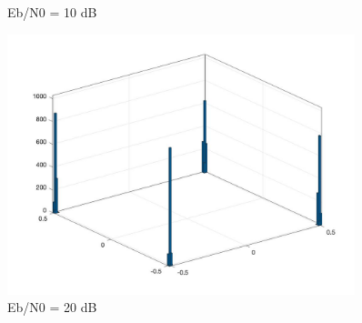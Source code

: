 \documentclass{article}
\begin{document}
\begin{CJK*}{UTF8}{bsmi}
\begin{figure}[!htb]
    \caption{\label{fig:2a_10.jpg} Eb/N0 = 10 dB}
    \end{figure}
    \begin{figure}[!htb]
    \centering
    \includegraphics[width=0.9\textwidth]{2a_20.jpg}
    \caption{\label{fig:2a_20.jpg} Eb/N0 = 20 dB}
    \end{figure}

\pagebreak



\end{CJK*}
\end{document}
